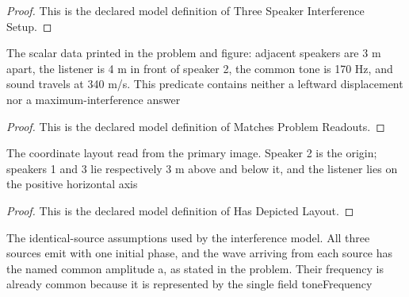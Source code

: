 \begin{proof}
  This is the declared model definition of Three Speaker Interference Setup.
\end{proof}
\begin{definition}
  \label{def:physics:phyx-mini-0186:phyxminiproblems-problemphyxmini0186-matchesproblemreadouts}
  The scalar data printed in the problem and figure: adjacent speakers are 3 m apart, the listener is 4 m in front of speaker 2, the common tone is 170 Hz, and sound travels at 340 m/s. This predicate contains neither a leftward displacement nor a maximum-interference answer
\end{definition}
\begin{proof}
  This is the declared model definition of Matches Problem Readouts.
\end{proof}
\begin{definition}
  \label{def:physics:phyx-mini-0186:phyxminiproblems-problemphyxmini0186-hasdepictedlayout}
  The coordinate layout read from the primary image. Speaker 2 is the origin; speakers 1 and 3 lie respectively 3 m above and below it, and the listener lies on the positive horizontal axis
\end{definition}
\begin{proof}
  This is the declared model definition of Has Depicted Layout.
\end{proof}
\begin{definition}
  \label{def:physics:phyx-mini-0186:phyxminiproblems-problemphyxmini0186-emitscoherentlywithcommonamplitude}
  The identical-source assumptions used by the interference model. All three sources emit with one initial phase, and the wave arriving from each source has the named common amplitude a, as stated in the problem. Their frequency is already common because it is represented by the single field toneFrequency
\end{definition}

